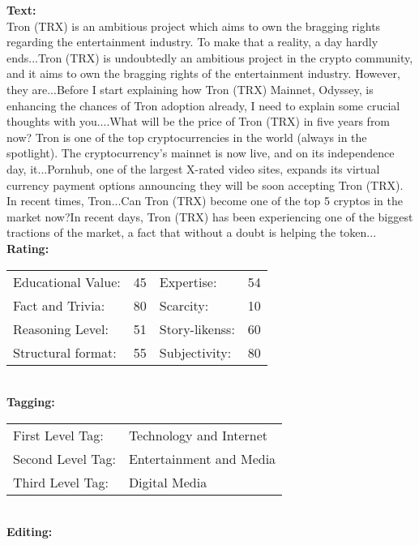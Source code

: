 \begin{tcolorbox}[title = {Case 2}, colframe=darkgreen, colback=lightgray, breakable]
\small
\textbf{Text:}\\Tron (TRX) is an ambitious project which aims to own the bragging rights regarding the entertainment industry. To make that a reality, a day hardly ends...Tron (TRX) is undoubtedly an ambitious project in the crypto community, and it aims to own the bragging rights of the entertainment industry. However, they are...Before I start explaining how Tron (TRX) Mainnet, Odyssey, is enhancing the chances of Tron adoption already, I need to explain some crucial thoughts with you....What will be the price of Tron (TRX) in five years from now? Tron is one of the top cryptocurrencies in the world (always in the spotlight). The cryptocurrency’s mainnet is now live, and on its independence day, it...Pornhub, one of the largest X-rated video sites, expands its virtual currency payment options announcing they will be soon accepting Tron (TRX). In recent times, Tron...Can Tron (TRX) become one of the top 5 cryptos in the market now?In recent days, Tron (TRX) has been experiencing one of the biggest tractions of the market, a fact that without a doubt is helping the token...\\
\textbf{Rating:}
\\
\begin{tabular}{@{}llll}
Educational Value: & 45 & Expertise: & 54 \\ 
Fact and Trivia: & 80 & Scarcity: & 10 \\
Reasoning Level: & 51   & Story-likenss: & 60 \\ 
Structural format: & 55 & Subjectivity: & 80 \\
\end{tabular}
\\
\textbf{Tagging:}
\\
\begin{tabular}{@{}ll}
First Level Tag: & Technology and Internet \\
Second Level Tag: & Entertainment and Media \\
Third Level Tag: & Digital Media \\
\end{tabular}
\\
\textbf{Editing:}
\\

\end{tcolorbox}
